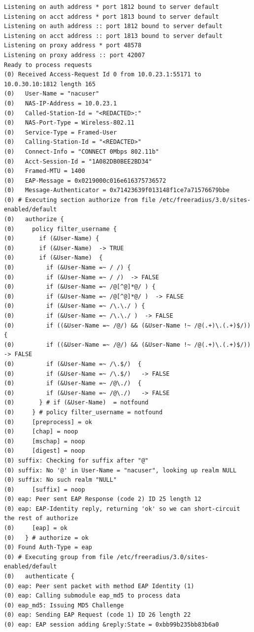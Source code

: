 \documentclass[11pt]{article}
\begin{document}
\begin{verbatim}
Listening on auth address * port 1812 bound to server default
Listening on acct address * port 1813 bound to server default
Listening on auth address :: port 1812 bound to server default
Listening on acct address :: port 1813 bound to server default
Listening on proxy address * port 48578
Listening on proxy address :: port 42007
Ready to process requests
(0) Received Access-Request Id 0 from 10.0.23.1:55171 to 10.0.30.10:1812 length 165
(0)   User-Name = "nacuser"
(0)   NAS-IP-Address = 10.0.23.1
(0)   Called-Station-Id = "<REDACTED>:"
(0)   NAS-Port-Type = Wireless-802.11
(0)   Service-Type = Framed-User
(0)   Calling-Station-Id = "<REDACTED>"
(0)   Connect-Info = "CONNECT 0Mbps 802.11b"
(0)   Acct-Session-Id = "1A082DB0BEE2BD34"
(0)   Framed-MTU = 1400
(0)   EAP-Message = 0x0219000c016e616375736572
(0)   Message-Authenticator = 0x71423639f013148f1ce7a71576679bbe
(0) # Executing section authorize from file /etc/freeradius/3.0/sites-enabled/default
(0)   authorize {
(0)     policy filter_username {
(0)       if (&User-Name) {
(0)       if (&User-Name)  -> TRUE
(0)       if (&User-Name)  {
(0)         if (&User-Name =~ / /) {
(0)         if (&User-Name =~ / /)  -> FALSE
(0)         if (&User-Name =~ /@[^@]*@/ ) {
(0)         if (&User-Name =~ /@[^@]*@/ )  -> FALSE
(0)         if (&User-Name =~ /\.\./ ) {
(0)         if (&User-Name =~ /\.\./ )  -> FALSE
(0)         if ((&User-Name =~ /@/) && (&User-Name !~ /@(.+)\.(.+)$/))  {
(0)         if ((&User-Name =~ /@/) && (&User-Name !~ /@(.+)\.(.+)$/))   -> FALSE
(0)         if (&User-Name =~ /\.$/)  {
(0)         if (&User-Name =~ /\.$/)   -> FALSE
(0)         if (&User-Name =~ /@\./)  {
(0)         if (&User-Name =~ /@\./)   -> FALSE
(0)       } # if (&User-Name)  = notfound
(0)     } # policy filter_username = notfound
(0)     [preprocess] = ok
(0)     [chap] = noop
(0)     [mschap] = noop
(0)     [digest] = noop
(0) suffix: Checking for suffix after "@"
(0) suffix: No '@' in User-Name = "nacuser", looking up realm NULL
(0) suffix: No such realm "NULL"
(0)     [suffix] = noop
(0) eap: Peer sent EAP Response (code 2) ID 25 length 12
(0) eap: EAP-Identity reply, returning 'ok' so we can short-circuit the rest of authorize
(0)     [eap] = ok
(0)   } # authorize = ok
(0) Found Auth-Type = eap
(0) # Executing group from file /etc/freeradius/3.0/sites-enabled/default
(0)   authenticate {
(0) eap: Peer sent packet with method EAP Identity (1)
(0) eap: Calling submodule eap_md5 to process data
(0) eap_md5: Issuing MD5 Challenge
(0) eap: Sending EAP Request (code 1) ID 26 length 22
(0) eap: EAP session adding &reply:State = 0xbb99b235bb83b6a0

\end{verbatim}
\end{document}

